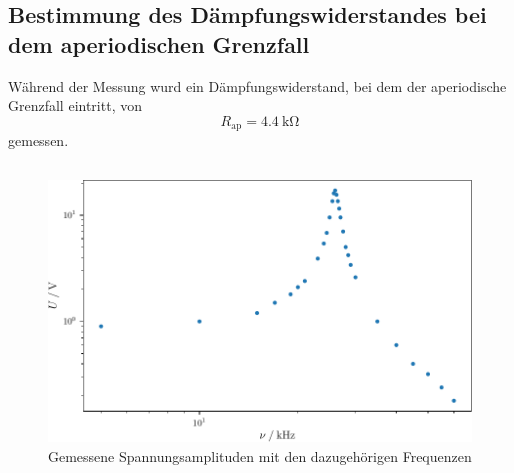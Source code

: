 \subsection{Bestimmung des Dämpfungswiderstandes bei dem aperiodischen Grenzfall}
Während der Messung wurd ein Dämpfungswiderstand, bei dem der aperiodische Grenzfall eintritt, von
\begin{equation*}
    R_\text{ap} = \SI{4.4}{\kilo\ohm}
\end{equation*}
gemessen.
\subsection{}
\begin{figure}
    \centering
    \caption{Gemessene Spannungsamplituden mit den dazugehörigen Frequenzen}
    \label{fig:frequence}
    \includegraphics{build/frequence.pdf}
\end{figure}